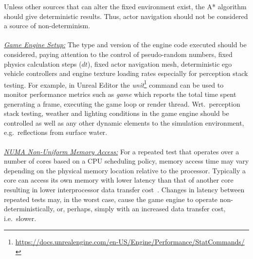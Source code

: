 \documentclass[letterpaper, 10 pt, journal, twoside]{IEEEtran}
\begin{document}
Unless other sources that can alter the fixed environment exist, the A* algorithm should give deterministic results. Thus, actor navigation should not be considered a source of non-determinism.
%
%
\\\\
\noindent\underline{\textit{Game Engine Setup:}}
The type and version of the engine code executed should be considered, paying attention to the control of pseudo-random numbers, fixed physics calculation steps ($dt$), fixed actor navigation mesh, deterministic ego vehicle controllers and engine texture loading rates especially for perception stack testing. %
For example, in Unreal Editor the \textit{unit}\footnote{\url{https://docs.unrealengine.com/en-US/Engine/Performance/StatCommands/}} command can be used to monitor performance metrics such as \textit{game} which reports 
the total time spent generating a frame, executing the game loop or render thread.
%
Wrt.\ perception stack testing, weather and lighting conditions in the game engine should be controlled as well as any other dynamic elements to the simulation environment, e.g.\ reflections from surface water. 
\\\\
\noindent\underline{\textit{NUMA Non-Uniform Memory Access:}}
For a repeated test that operates over a number of cores based on a CPU scheduling policy, memory access time may vary depending on the physical memory location relative to the processor. Typically a core can access its own memory with lower latency than that of another core resulting in lower interprocessor data transfer cost~\cite{nieplocha1996global}. 
%
Changes in latency between repeated tests may, in the worst case, cause the game engine to operate non-deterministically, or, perhaps, simply with an increased data transfer cost, i.e.\ slower. 
\end{document}
